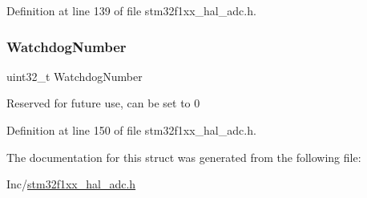 Definition at line 139 of file stm32f1xx\+\_\+hal\+\_\+adc.\+h.

\mbox{\label{struct_a_d_c___analog_w_d_g_conf_type_def_a316457f389072f7a80b62e2b3c8fdef4}} 
\subsubsection{\texorpdfstring{Watchdog\+Number}{WatchdogNumber}}
{\footnotesize\ttfamily uint32\+\_\+t Watchdog\+Number}

Reserved for future use, can be set to 0 

Definition at line 150 of file stm32f1xx\+\_\+hal\+\_\+adc.\+h.



The documentation for this struct was generated from the following file\+:\begin{DoxyCompactItemize}
\item 
Inc/\hyperlink{stm32f1xx__hal__adc_8h}{stm32f1xx\+\_\+hal\+\_\+adc.\+h}\end{DoxyCompactItemize}
